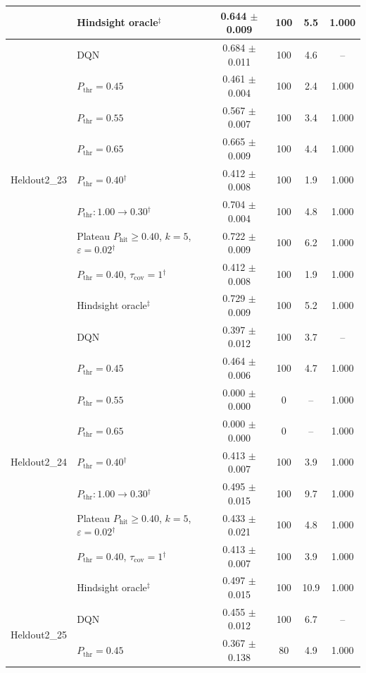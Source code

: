 \begin{table}[htbp]
\begin{tabular}{llcccc}
 & Hindsight oracle$^{\ddagger}$ & 0.644 $\pm$ 0.009 & 100 & 5.5 & 1.000 \\
\midrule
\multirow{9}{*}{Heldout2\_23} & DQN & 0.684 $\pm$ 0.011 & 100 & 4.6 & -- \\
 & $P_{\mathrm{thr}}=0.45$ & 0.461 $\pm$ 0.004 & 100 & 2.4 & 1.000 \\
 & $P_{\mathrm{thr}}=0.55$ & 0.567 $\pm$ 0.007 & 100 & 3.4 & 1.000 \\
 & $P_{\mathrm{thr}}=0.65$ & 0.665 $\pm$ 0.009 & 100 & 4.4 & 1.000 \\
 & $P_{\mathrm{thr}}=0.40$$^{\dagger}$ & 0.412 $\pm$ 0.008 & 100 & 1.9 & 1.000 \\
 & $P_{\mathrm{thr}}: 1.00 \to 0.30$$^{\dagger}$ & 0.704 $\pm$ 0.004 & 100 & 4.8 & 1.000 \\
 & Plateau $P_{\mathrm{hit}}\geq0.40$, $k=5$, $\varepsilon=0.02$$^{\dagger}$ & 0.722 $\pm$ 0.009 & 100 & 6.2 & 1.000 \\
 & $P_{\mathrm{thr}}=0.40$, $\tau_{\mathrm{cov}}=1$$^{\dagger}$ & 0.412 $\pm$ 0.008 & 100 & 1.9 & 1.000 \\
 & Hindsight oracle$^{\ddagger}$ & 0.729 $\pm$ 0.009 & 100 & 5.2 & 1.000 \\
\midrule
\multirow{9}{*}{Heldout2\_24} & DQN & 0.397 $\pm$ 0.012 & 100 & 3.7 & -- \\
 & $P_{\mathrm{thr}}=0.45$ & 0.464 $\pm$ 0.006 & 100 & 4.7 & 1.000 \\
 & $P_{\mathrm{thr}}=0.55$ & 0.000 $\pm$ 0.000 & 0 & -- & 1.000 \\
 & $P_{\mathrm{thr}}=0.65$ & 0.000 $\pm$ 0.000 & 0 & -- & 1.000 \\
 & $P_{\mathrm{thr}}=0.40$$^{\dagger}$ & 0.413 $\pm$ 0.007 & 100 & 3.9 & 1.000 \\
 & $P_{\mathrm{thr}}: 1.00 \to 0.30$$^{\dagger}$ & 0.495 $\pm$ 0.015 & 100 & 9.7 & 1.000 \\
 & Plateau $P_{\mathrm{hit}}\geq0.40$, $k=5$, $\varepsilon=0.02$$^{\dagger}$ & 0.433 $\pm$ 0.021 & 100 & 4.8 & 1.000 \\
 & $P_{\mathrm{thr}}=0.40$, $\tau_{\mathrm{cov}}=1$$^{\dagger}$ & 0.413 $\pm$ 0.007 & 100 & 3.9 & 1.000 \\
 & Hindsight oracle$^{\ddagger}$ & 0.497 $\pm$ 0.015 & 100 & 10.9 & 1.000 \\
\midrule
\multirow{9}{*}{Heldout2\_25} & DQN & 0.455 $\pm$ 0.012 & 100 & 6.7 & -- \\
 & $P_{\mathrm{thr}}=0.45$ & 0.367 $\pm$ 0.138 & 80 & 4.9 & 1.000 \\

\end{tabular}
\end{table}
